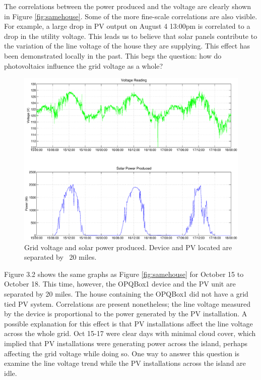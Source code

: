 The correlations between the power produced and the voltage are clearly shown in Figure  \ref{fig:samehouse}. Some of the more fine-scale correlations are also visible. 
For example, a large drop in PV output on August 4 13:00pm is correlated to a drop in the utility voltage. This leads us to believe that solar panels contribute to the
variation of the line voltage of the house they are supplying. This effect has been demonstrated locally in the past.\cite{pq_effect1} This begs the question: how do photovoltaics influence the grid voltage as a whole?

\begin{figure}[h!]
\centering
\includegraphics[width=\textwidth]{img/SunnyWeather.eps}
\caption{Grid voltage and solar power produced. Device and PV located are separated by ~20 miles.}
\label{fig:diffhouse}
\end{figure} 

Figure 3.2 shows the same graphs as Figure \ref{fig:samehouse} for October 15 to October 18. This time, however, the OPQBox1 device and the PV unit are separated by 20 miles. The house containing the OPQBox1 did not have a grid tied PV system. Correlations are present nonetheless; the line voltage measured by the device is proportional to the power generated by the PV installation. A possible explanation for this effect is that PV installations affect the line voltage across the whole grid. Oct 15-17 were clear days with minimal cloud cover, which implied that PV installations were generating power across the island, perhaps affecting the grid voltage while doing so. One way to answer this question is examine the line voltage trend while the PV installations
across the island are idle. 

